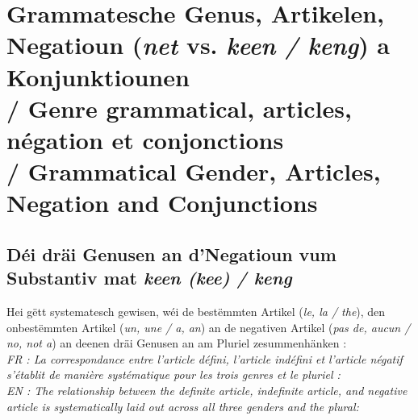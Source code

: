 \section[Genus, Artikelen, Negatioun a Konjunktiounen / Gender, Articles and Negation]{Grammatesche Genus, Artikelen, Negatioun (\textit{net} vs. \textit{keen / keng}) a Konjunktiounen \\/ Genre grammatical, articles, négation et conjonctions \\/ Grammatical Gender, Articles, Negation and Conjunctions}

\subsection{Déi dräi Genusen an d'Negatioun vum Substantiv mat \textit{keen (kee) / keng}}

Hei gëtt systematesch gewisen, wéi de bestëmmten Artikel (\textit{le, la / the}), den onbestëmmten Artikel (\textit{un, une / a, an}) an de negativen Artikel (\textit{pas de, aucun / no, not a}) an deenen dräi Genusen an am Pluriel zesummenhänken : \\
\textit{FR : La correspondance entre l'article défini, l'article indéfini et l'article négatif s'établit de manière systématique pour les trois genres et le pluriel :} \\
\textit{EN : The relationship between the definite article, indefinite article, and negative article is systematically laid out across all three genders and the plural:}

